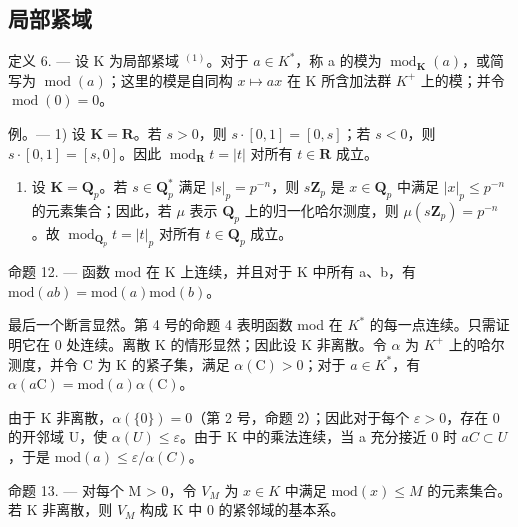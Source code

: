 \subsection{局部紧域}

定义 6. --- 设 K 为局部紧域 \(^{(1)}\)。对于 \(a \in K^{*}\)，称 a 的模为 \(\operatorname{mod}_{\mathbf{K}}(a)\)，或简写为 \(\operatorname{mod}(a)\)；这里的模是自同构 \(x \mapsto ax\) 在 K 所含加法群 \(K^{+}\) 上的模；并令 \(\operatorname{mod}(0) = 0\)。

例。--- 1) 设 \(\mathbf{K} = \mathbf{R}\)。若 \(s > 0\)，则 \(s \cdot [0,1] = [0,s]\)；若 \(s < 0\)，则 \(s \cdot [0,1] = [s,0]\)。因此 \(\operatorname{mod}_{\mathbf{R}} t = |t|\) 对所有 \(t \in \mathbf{R}\) 成立。

\begin{enumerate}
\def\labelenumi{\arabic{enumi})}
\setcounter{enumi}{1}
\tightlist
\item
  设 \(\mathbf{K} = \mathbf{Q}_p\)。若 \(s \in \mathbf{Q}_p^*\) 满足 \(|s|_p = p^{-n}\)，则 \(s\mathbf{Z}_p\) 是 \(x \in \mathbf{Q}_p\) 中满足 \(|x|_p \leqslant p^{-n}\) 的元素集合；因此，若 \(\mu\) 表示 \(\mathbf{Q}_p\) 上的归一化哈尔测度，则 \(\mu(s\mathbf{Z}_p) = p^{-n}\)。故 \(\operatorname{mod}_{\mathbf{Q}_p} t = |t|_p\) 对所有 \(t \in \mathbf{Q}_p\) 成立。
\end{enumerate}

命题 12. --- 函数 mod 在 K 上连续，并且对于 K 中所有 a、b，有 \(\text{mod}(ab) = \text{mod}(a)\text{mod}(b)\)。

最后一个断言显然。第 4 号的命题 4 表明函数 mod 在 \(K^{*}\) 的每一点连续。只需证明它在 0 处连续。离散 K 的情形显然；因此设 K 非离散。令 \(\alpha\) 为 \(K^{+}\) 上的哈尔测度，并令 C 为 K 的紧子集，满足 \(\alpha(\mathrm{C}) > 0\)；对于 \(a \in K^{*}\)，有 \(\alpha(a\mathrm{C}) = \mathrm{mod}(a)\alpha(\mathrm{C})\)。

由于 K 非离散，\(\alpha(\{0\}) = 0\)（第 2 号，命题 2）；因此对于每个 \(\varepsilon > 0\)，存在 0 的开邻域 U，使 \(\alpha(U) \leqslant \varepsilon\)。由于 K 中的乘法连续，当 a 充分接近 0 时 \(aC \subset U\)，于是 \(\text{mod}(a) \leqslant \varepsilon / \alpha(C)\)。

命题 13. --- 对每个 M \textgreater{} 0，令 \(V_{M}\) 为 \(x \in K\) 中满足 \(\text{mod}(x) \leqslant M\) 的元素集合。若 K 非离散，则 \(V_{M}\) 构成 K 中 0 的紧邻域的基本系。

